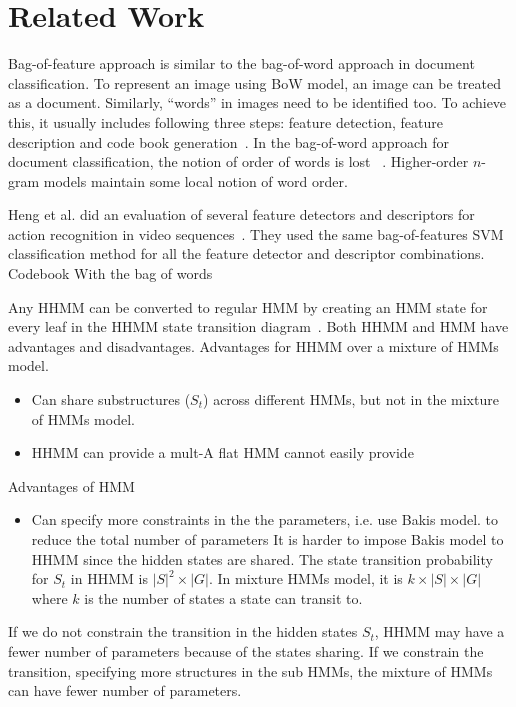 \documentclass{sigchi}
\begin{document}
\section{Related Work}
Bag-of-feature approach is similar to the bag-of-word approach in document classification. 
To represent an image using BoW model, an image can be treated as a document. Similarly,
``words'' in images need to be identified too. To achieve this, it usually includes
following three steps: feature detection, feature description and code book generation~\cite{fei2005}.
In the bag-of-word approach for document classification, the notion of order of words is lost
~\cite{Russell2003}. Higher-order $n$-gram models maintain some local notion of word order.

Heng et al. did an evaluation of several feature detectors and descriptors for action
recognition in video sequences~\cite{wang2009}. They used the same bag-of-features SVM classification
method for all the feature detector and descriptor combinations. 
Codebook With the bag of words

Any HHMM can be converted to regular HMM by creating an HMM state for every leaf in the HHMM
state transition diagram~\cite{murphy02}. Both HHMM and HMM have advantages and disadvantages. Advantages for HHMM
over a mixture of HMMs model.
\begin{itemize}
  \item Can share substructures ($S_t$) across different HMMs, but not in the mixture of HMMs model.
  \item HHMM can provide a mult-A flat HMM cannot easily provide 
\end{itemize}

Advantages of HMM
\begin{itemize}
  \item Can specify more constraints in the the parameters, i.e. use Bakis model. to reduce the total number of parameters
It is harder to impose Bakis model to HHMM since the hidden states are shared. The state transition probability for $S_t$ in HHMM
is $|S|^2 \times |G| $. In mixture HMMs model, it is $k\times |S|\times|G|$ where $k$ is the number of states a state can transit to. 
\end{itemize}

If we do not constrain the transition in the hidden states $S_t$, HHMM may have a fewer number of parameters because of the states sharing.
If we constrain the transition, specifying more structures in the sub HMMs, the mixture of HMMs can have fewer number of parameters.
\end{document}
